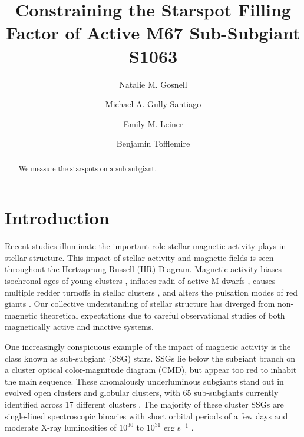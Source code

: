 \documentclass[trackchanges]{aastex631}
\begin{document}

\title{Constraining the Starspot Filling Factor of Active M67 Sub-Subgiant S1063}

\author{Natalie M. Gosnell}
\author{Michael A. Gully-Santiago}
\author{Emily M. Leiner}
\author{Benjamin Tofflemire}


\begin{abstract}

We measure the starspots on a sub-subgiant.

\end{abstract}



\section{Introduction}\label{sec:intro}
Recent studies illuminate the important role stellar magnetic activity plays in stellar structure. This impact of stellar activity and magnetic fields is seen throughout the Hertzsprung-Russell (HR) Diagram. Magnetic activity biases isochronal ages of young clusters \citep{somers15}, inflates radii of active M-dwarfs \citep{2010AJ....140.1158T,2010ApJ...718..502M,2019MNRAS.483.1125J}, causes multiple redder turnoffs in stellar clusters \citep{2009MNRAS.398L..11B,2019ApJ...876..113S}, and alters the pulsation modes of red giants \citep{2020A&A...639A..63G}. Our collective understanding of stellar structure has diverged from non-magnetic theoretical expectations due to careful observational studies of both magnetically active and inactive systems.

One increasingly conspicuous example of the impact of magnetic activity is the class known as sub-subgiant (SSG) stars.  SSGs lie below the subgiant branch on a cluster optical color-magnitude diagram (CMD), but appear too red to inhabit the main sequence. These anomalously underluminous subgiants stand out in evolved open clusters and globular clusters, with 65 sub-subgiants currently identified across 17 different clusters \citep{geller17}. The majority of these cluster SSGs are single-lined spectroscopic binaries with short orbital periods of a few days and moderate X-ray luminosities of $10^{30}$ to $10^{31}$ erg s$^{-1}$ \citep[and references therein]{geller17}.
\end{document}
